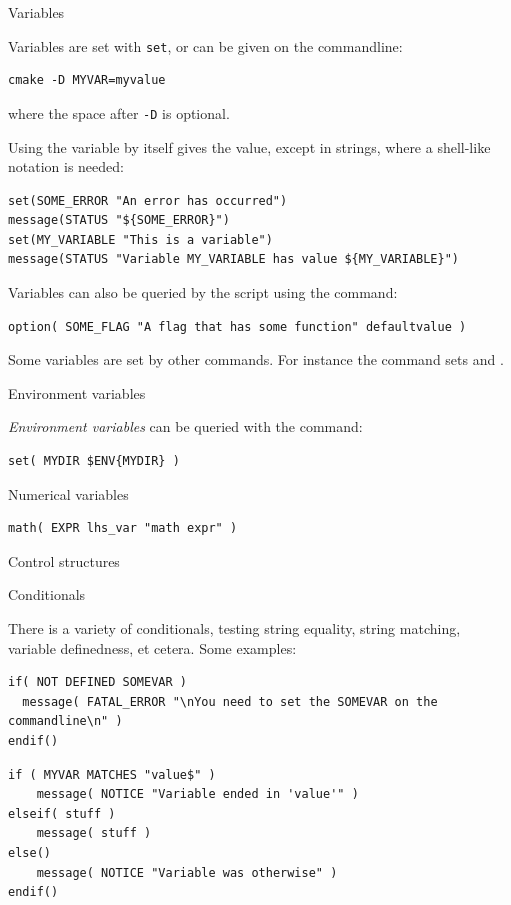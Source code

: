  {Variables}

Variables are set with \lstinline{set},
or can be given on the commandline:
\begin{lstlisting}
cmake -D MYVAR=myvalue
\end{lstlisting}
where the space after \lstinline[language=shell]{-D} is optional.

Using the variable by itself gives the value,
except in strings, where a shell-like notation is needed:
\begin{lstlisting}
set(SOME_ERROR "An error has occurred")
message(STATUS "${SOME_ERROR}")
set(MY_VARIABLE "This is a variable")
message(STATUS "Variable MY_VARIABLE has value ${MY_VARIABLE}")
\end{lstlisting}

Variables can also be queried by the  script using the  command:
\begin{lstlisting}
option( SOME_FLAG "A flag that has some function" defaultvalue )
\end{lstlisting}

Some variables are set by other commands.
For instance the  command sets
 and .

 {Environment variables}

\emph{Environment variables}
can be queried with the  command:
\begin{lstlisting}
set( MYDIR $ENV{MYDIR} )
\end{lstlisting}

 {Numerical variables}

\begin{lstlisting}
math( EXPR lhs_var "math expr" )
\end{lstlisting}

 {Control structures}

 {Conditionals}

There is a variety of conditionals,
testing string equality, string matching, variable definedness, et cetera.
Some examples:
\begin{lstlisting}
if( NOT DEFINED SOMEVAR )
  message( FATAL_ERROR "\nYou need to set the SOMEVAR on the commandline\n" )
endif()
\end{lstlisting}

\begin{lstlisting}
if ( MYVAR MATCHES "value$" )
    message( NOTICE "Variable ended in 'value'" )
elseif( stuff )
    message( stuff )
else()
    message( NOTICE "Variable was otherwise" )
endif()
\end{lstlisting}

